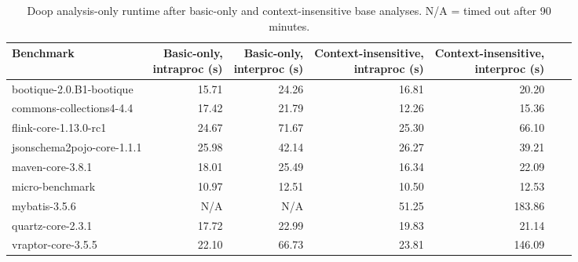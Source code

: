\begin{table*}
	\centering
	\caption{Doop analysis-only runtime after basic-only and context-insensitive base analyses. N/A = timed out after 90 minutes.}
	\begin{tabular}{lrrrrrr}
		\toprule
		Benchmark & \thead{Basic-only, \\ intraproc (s)} & \thead{Basic-only, \\ interproc (s)} & \thead{Context-insensitive, \\ intraproc (s)}  & \thead{Context-insensitive, \\ interproc (s)}  \\
		\midrule
		bootique-2.0.B1-bootique           		& 15.71  &  24.26   & 16.81  &  20.20     \\
		commons-collections4-4.4           		& 17.42  &  21.79  & 12.26 	&  15.36        \\
		flink-core-1.13.0-rc1           		& 24.67  &  71.67  & 25.30  &  66.10         \\
		jsonschema2pojo-core-1.1.1         		& 25.98  &  42.14  & 26.27  &  39.21         \\
		maven-core-3.8.1   		           		& 18.01  &  25.49  & 16.34  &  22.09          \\
		micro-benchmark         		  		& 10.97  &  12.51  & 10.50  &  12.53        \\
		mybatis-3.5.6         		  			&  N/A   &   N/A   & 51.25  & 183.86          \\
		quartz-core-2.3.1        	  			& 17.72  &  22.99  & 19.83  &  21.14        \\
		vraptor-core-3.5.5         	  			& 22.10  &  66.73  & 23.81  &  146.09       \\
		\bottomrule
	\end{tabular}
	\label{tab:doop-runtimes}
\end{table*}

